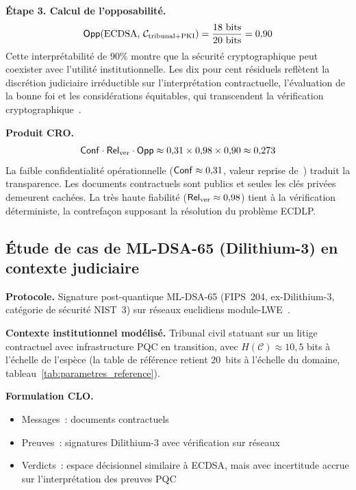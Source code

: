 \begin{sloppypar}
\noindent\textbf{\'Etape 3. Calcul de l'opposabilit\'e.}
\begin{equation}
\mathsf{Opp}(\text{ECDSA},\, \mathcal{C}_{\text{tribunal+PKI}})
= \frac{18 \text{ bits}}{20 \text{ bits}} = 0{,}90
\label{eq:opp_ecdsa}
\end{equation}
Cette interpr\'etabilit\'e de $90\%$ montre que la s\'ecurit\'e
cryptographique peut coexister avec l'utilit\'e institutionnelle.
Les dix pour cent r\'esiduels refl\`etent la discr\'etion judiciaire
irr\'eductible sur l'interpr\'etation contractuelle, l'\'evaluation de la bonne
foi et les consid\'erations \'equitables, qui transcendent la v\'erification
cryptographique~\cite{MINKA2026CLO}.

\noindent\textbf{Produit CRO.}
\begin{equation}
\mathsf{Conf} \cdot \mathsf{Rel}_{\mathrm{ver}} \cdot \mathsf{Opp}
\approx 0{,}31 \times 0{,}98 \times 0{,}90 \approx 0{,}273
\label{eq:produit_ecdsa}
\end{equation}
La faible confidentialit\'e op\'erationnelle ($\mathsf{Conf} \approx 0{,}31$, valeur reprise
de~\cite{MINKA2026CLO}) traduit la transparence. Les documents contractuels sont publics et seules
les cl\'es priv\'ees demeurent cach\'ees. La tr\`es haute fiabilit\'e
($\mathsf{Rel}_{\mathrm{ver}} \approx 0{,}98$) tient \`a la v\'erification d\'eterministe, la
contrefa\c{c}on supposant la r\'esolution du probl\`eme ECDLP.

\subsection{\'Etude de cas de ML-DSA-65 (Dilithium-3) en contexte judiciaire}
\label{sec:etude_cas_dilithium}

\noindent\textbf{Protocole.} Signature post-quantique ML-DSA-65 (FIPS~204,
ex-Dilithium-3, cat\'egorie de s\'ecurit\'e NIST~3) sur r\'eseaux euclidiens module-LWE~\cite{Dilithium2022}.

\noindent\textbf{Contexte institutionnel mod\'elis\'e.} Tribunal civil statuant
sur un litige contractuel avec infrastructure PQC en transition, avec
$H(\mathcal{C}) \approx 10{,}5$ bits \`a l'\'echelle de l'esp\`ece (la table de
r\'ef\'erence retient $20$~bits \`a l'\'echelle du domaine,
tableau~\ref{tab:parametres_reference}).

\noindent\textbf{Formulation CLO.}
\begin{itemize}
\item Messages~: documents contractuels
\item Preuves~: signatures Dilithium-3 avec v\'erification sur r\'eseaux
\item Verdicts~: espace d\'ecisionnel similaire \`a ECDSA, mais avec
      incertitude accrue sur l'interpr\'etation des preuves PQC
\end{itemize}


\end{sloppypar}
